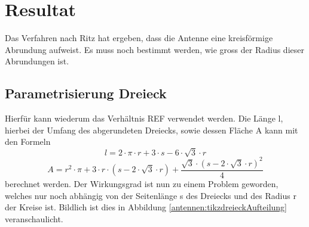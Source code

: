 %
%
% 
%
%

\section{Resultat\label{antennen:resultat}}

Das Verfahren nach Ritz hat ergeben, dass die Antenne eine kreisförmige Abrundung aufweist. Es muss noch bestimmt werden, wie gross der Radius dieser Abrundungen ist. 

\subsection{Parametrisierung Dreieck\label{antennen:param3eck}}
Hierfür kann wiederum das Verhältnis REF verwendet werden. Die Länge l, hierbei der Umfang des abgerundeten Dreiecks, sowie dessen Fläche A kann mit den Formeln
\begin{equation}
	l=2\cdot{\pi}\cdot{r}+3\cdot{s}-6\cdot{\sqrt{3}}\cdot{r}
	\label{antennen:Länge}
\end{equation}
\begin{equation}
	A=r^2\cdot{\pi}+3\cdot{r}\cdot{(s-2\cdot{\sqrt{3}}\cdot{r})}+\frac{\sqrt{3}\cdot{(s-2\cdot{\sqrt{3}}\cdot{r})^2}}{4}
	\label{antennen:Fläche}
\end{equation}
berechnet werden.
Der Wirkungsgrad ist nun zu einem Problem geworden, welches nur noch abhängig von der Seitenlänge s des Dreiecks und des Radius r der Kreise ist. Bildlich ist dies in Abbildung \ref{antennen:tikzdreieckAufteilung} veranschaulicht.
